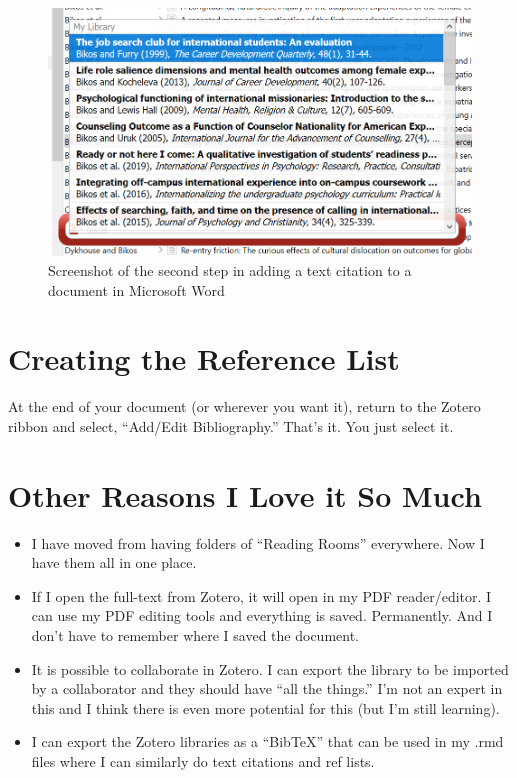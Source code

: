 \documentclass[
  english,
]{book}
\providecommand{\tightlist}{%
  \setlength{\itemsep}{0pt}\setlength{\parskip}{0pt}}
\begin{document}
\begin{figure}
\centering
\includegraphics{images/Zotero/InsertingCitations2.png}
\caption{Screenshot of the second step in adding a text citation to a document in Microsoft Word}
\end{figure}

\hypertarget{creating-the-reference-list}{%
\section{Creating the Reference List}\label{creating-the-reference-list}}

At the end of your document (or wherever you want it), return to the Zotero ribbon and select, ``Add/Edit Bibliography.'' That's it. You just select it.

\hypertarget{other-reasons-i-love-it-so-much}{%
\section{Other Reasons I Love it So Much}\label{other-reasons-i-love-it-so-much}}

\begin{itemize}
\tightlist
\item
  I have moved from having folders of ``Reading Rooms'' everywhere. Now I have them all in one place.
\item
  If I open the full-text from Zotero, it will open in my PDF reader/editor. I can use my PDF editing tools and everything is saved. Permanently. And I don't have to remember where I saved the document.
\item
  It is possible to collaborate in Zotero. I can export the library to be imported by a collaborator and they should have ``all the things.'' I'm not an expert in this and I think there is even more potential for this (but I'm still learning).
\item
  I can export the Zotero libraries as a ``BibTeX'' that can be used in my .rmd files where I can similarly do text citations and ref lists.
\end{itemize}
\end{document}

